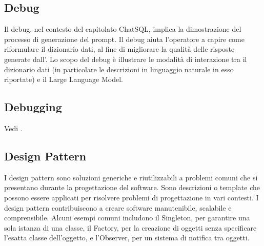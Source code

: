 \vspace{2em}
\subsection*{Debug}
\par Il debug, nel contesto del capitolato ChatSQL, implica la dimostrazione del processo di generazione del prompt. Il debug aiuta l'operatore a capire come riformulare il dizionario dati, al fine di migliorare la qualità delle risposte generate dall'. Lo scopo del debug è illustrare le modalità di interazione tra il dizionario dati (in particolare le descrizioni in linguaggio naturale in esso riportate) e il Large Language Model.


\vspace{2em}
\subsection*{Debugging}
\par Vedi .

\vspace{2em}
\subsection*{Design Pattern}
\par I design pattern sono soluzioni generiche e riutilizzabili a problemi comuni che si presentano durante la progettazione del software. Sono descrizioni o template che possono essere applicati per risolvere problemi di progettazione in vari contesti. I design pattern contribuiscono a creare software manutenibile, scalabile e comprensibile. Alcuni esempi comuni includono il Singleton, per garantire una sola istanza di una classe, il Factory, per la creazione di oggetti senza specificare l'esatta classe dell'oggetto, e l'Observer, per un sistema di notifica tra oggetti.

